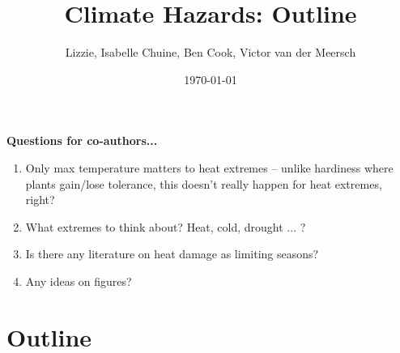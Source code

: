 \documentclass[11pt,letter]{article}
\begin{document}

\renewcommand{\refname}{\CHead{}}

\title{Climate Hazards: Outline} %
\author{Lizzie, Isabelle Chuine, Ben Cook, Victor van der Meersch} %
\date{\today}
\maketitle

{\bf Questions for co-authors...}
\begin{enumerate}
\item Only max temperature matters to heat extremes -- unlike hardiness where plants gain/lose tolerance, this doesn't really happen for heat extremes, right?
\item What extremes to think about? Heat, cold, drought ... ?
\item Is there any literature on heat damage as limiting seasons?
\item Any ideas on figures?
\end{enumerate}

\section{Outline}
\end{document}
